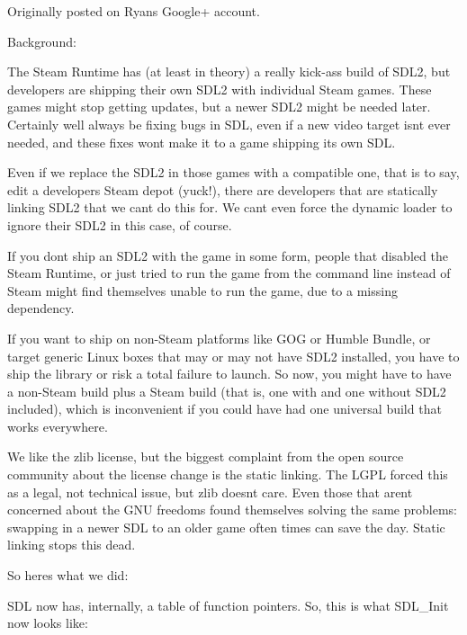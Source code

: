 Originally posted on Ryan\textquotesingle{}s Google+ account.

Background\+:


\begin{DoxyItemize}
\item The Steam Runtime has (at least in theory) a really kick-\/ass build of SDL2, but developers are shipping their own SDL2 with individual Steam games. These games might stop getting updates, but a newer SDL2 might be needed later. Certainly we\textquotesingle{}ll always be fixing bugs in SDL, even if a new video target isn\textquotesingle{}t ever needed, and these fixes won\textquotesingle{}t make it to a game shipping its own SDL.
\item Even if we replace the SDL2 in those games with a compatible one, that is to say, edit a developer\textquotesingle{}s Steam depot (yuck!), there are developers that are statically linking SDL2 that we can\textquotesingle{}t do this for. We can\textquotesingle{}t even force the dynamic loader to ignore their SDL2 in this case, of course.
\item If you don\textquotesingle{}t ship an SDL2 with the game in some form, people that disabled the Steam Runtime, or just tried to run the game from the command line instead of Steam might find themselves unable to run the game, due to a missing dependency.
\item If you want to ship on non-\/\+Steam platforms like GOG or Humble Bundle, or target generic Linux boxes that may or may not have SDL2 installed, you have to ship the library or risk a total failure to launch. So now, you might have to have a non-\/\+Steam build plus a Steam build (that is, one with and one without SDL2 included), which is inconvenient if you could have had one universal build that works everywhere.
\item We like the zlib license, but the biggest complaint from the open source community about the license change is the static linking. The LGPL forced this as a legal, not technical issue, but zlib doesn\textquotesingle{}t care. Even those that aren\textquotesingle{}t concerned about the GNU freedoms found themselves solving the same problems\+: swapping in a newer SDL to an older game often times can save the day. Static linking stops this dead.
\end{DoxyItemize}

So here\textquotesingle{}s what we did\+:

SDL now has, internally, a table of function pointers. So, this is what SDL\+\_\+\+Init now looks like\+:


